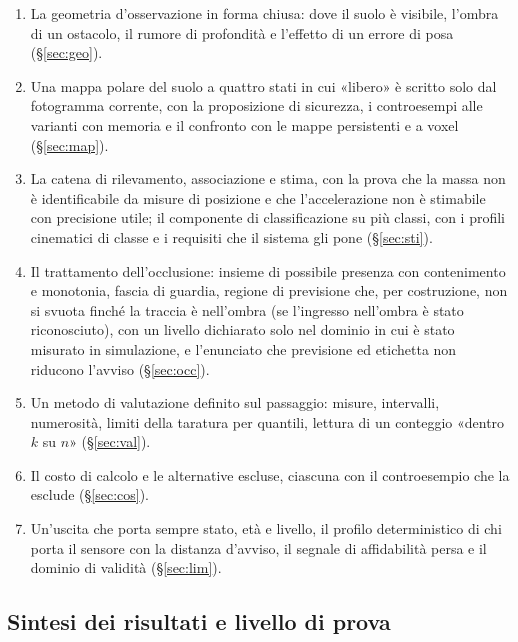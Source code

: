 \begin{enumerate}[label=\arabic*.]
\item La geometria d'osservazione in forma chiusa: dove il suolo è visibile, l'ombra di un ostacolo, il rumore di profondità e l'effetto di un errore di posa (\S\ref{sec:geo}).
\item Una mappa polare del suolo a quattro stati in cui «libero» è scritto solo dal fotogramma corrente, con la proposizione di sicurezza, i controesempi alle varianti con memoria e il confronto con le mappe persistenti e a voxel (\S\ref{sec:map}).
\item La catena di rilevamento, associazione e stima, con la prova che la massa non è identificabile da misure di posizione e che l'accelerazione non è stimabile con precisione utile; il componente di classificazione su più classi, con i profili cinematici di classe e i requisiti che il sistema gli pone (\S\ref{sec:sti}).
\item Il trattamento dell'occlusione: insieme di possibile presenza con contenimento e monotonia, fascia di guardia, regione di previsione che, per costruzione, non si svuota finché la traccia è nell'ombra (se l'ingresso nell'ombra è stato riconosciuto), con un livello dichiarato solo nel dominio in cui è stato misurato in simulazione, e l'enunciato che previsione ed etichetta non riducono l'avviso (\S\ref{sec:occ}).
\item Un metodo di valutazione definito sul passaggio: misure, intervalli, numerosità, limiti della taratura per quantili, lettura di un conteggio «dentro $k$ su $n$» (\S\ref{sec:val}).
\item Il costo di calcolo e le alternative escluse, ciascuna con il controesempio che la esclude (\S\ref{sec:cos}).
\item Un'uscita che porta sempre stato, età e livello, il profilo deterministico di chi porta il sensore con la distanza d'avviso, il segnale di affidabilità persa e il dominio di validità (\S\ref{sec:lim}).
\end{enumerate}

\subsection{Sintesi dei risultati e livello di prova}\label{sec:intro-sintesi}

